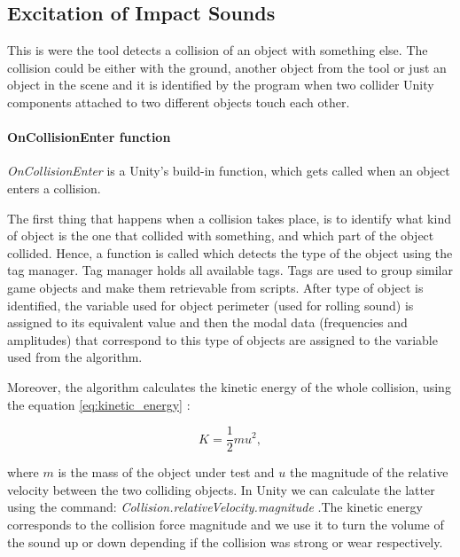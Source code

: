 \subsection{Excitation of Impact Sounds}\label{sec:coll_enter}
This is were the tool detects a collision of an object with something else. The collision could be either with the ground, another object from the tool or just an object in the scene and it is identified by the program when two collider Unity\textsuperscript{\textregistered} components attached to two different objects touch each other.

\paragraph{OnCollisionEnter function\\}

\textit{OnCollisionEnter} \cite{bib:unity_doc} is a Unity\textsuperscript{\textregistered}'s build-in function, which gets called when an object enters a collision.

The first thing that happens when a collision takes place, is to identify what kind of object is the one that collided with something, and which part of the object collided. Hence, a function is called which detects the type of the object using the tag manager. Tag manager holds all available tags. Tags are used to group similar game objects and make them retrievable from scripts. After type of object is identified, the variable used for object perimeter (used for rolling sound) is assigned to its equivalent value and then the modal data (frequencies and amplitudes) that correspond to this type of objects are assigned to the variable used from the algorithm.

Moreover, the algorithm calculates the kinetic energy of the whole collision, using the equation \ref{eq:kinetic_energy} \cite{crowell2003conservation}: 

\begin{equation}\label{eq:kinetic_energy}
K = \frac{1}{2} m u^2,
\end{equation}

\noindent where $m$ is the mass of the object under test and $u$ the magnitude of the relative velocity between the two colliding objects. In Unity\textsuperscript{\textregistered} we can calculate the latter using the command: \textit{Collision.relativeVelocity.magnitude} \cite{bib:unity_doc}.The kinetic energy corresponds to the collision force magnitude and we use it to turn the volume of the sound up or down depending if the collision was strong or wear respectively.

